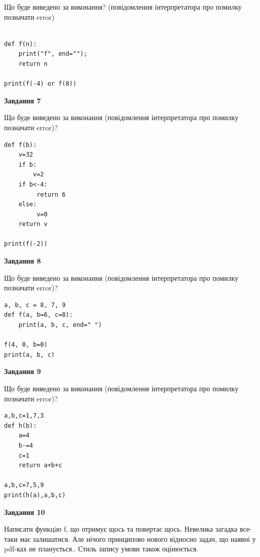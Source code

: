 \documentclass[12pt, ukrainian]{article}
\begin{document}
{\begin {large}
Що буде виведено за виконання? (повідомлення інтерпретатора про помилку позначати error)\par
\begin{verbatim}

def f(n):
    print("f", end="");
    return n

print(f(-4) or f(8))
\end{verbatim}

{\begin {center}\textbf{Завдання 7}\end {center}}

Що буде виведено за виконання (повідомлення інтерпретатора про помилку позначати error)?\par
\begin{verbatim}
def f(b):
    v=32
    if b: 
        v=2
    if b<-4:
         return 6
    else:
         v=0
    return v

print(f(-2))
\end{verbatim}

{\begin {center}\textbf{Завдання 8}\end {center}}

Що буде виведено за виконання (повідомлення інтерпретатора про помилку позначати error)?\par
\begin{verbatim}
a, b, c = 8, 7, 9
def f(a, b=6, c=8):
    print(a, b, c, end=" ")

f(4, 0, b=0)
print(a, b, c)
\end{verbatim}

{\begin {center}\textbf{Завдання 9}\end {center}}

Що буде виведено за виконання (повідомлення інтерпретатора про помилку позначати error)?\par
\begin{verbatim}
a,b,c=1,7,3
def h(b):
    a=4
    b-=4
    c=1
    return a+b+c

a,b,c=7,5,9
print(h(a),a,b,c)
\end{verbatim}

{\begin {center}\textbf{Завдання 10}\end {center}}


Написати функцiю f, що отримує щось та повертає щось. Невелика загадка все-таки має залишатися. Але нічого принципово нового відносно задач, що наявні у pdf-ках не планується.. Стиль запису умови також оцінюється.\par
\end {large}}
\newpage
\end{document}
